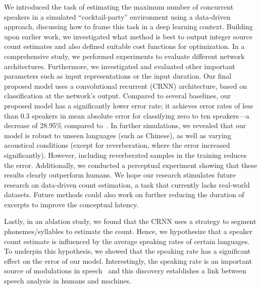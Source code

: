 We introduced the task of estimating the maximum number of concurrent speakers in a simulated ``cocktail-party'' environment using a data-driven approach, discussing how to frame this task in a deep learning context.
Building upon earlier work, we investigated what method is best to output integer source count estimates and also defined suitable cost functions for optimization.
In a comprehensive study, we performed experiments to evaluate different network architectures.
Furthermore, we investigated and evaluated other important parameters such as input representations or the input duration.
Our final proposed model uses a convolutional recurrent (CRNN) architecture, based on classification at the network's output.
Compared to several baselines, our proposed model has a significantly lower error rate;
it achieves error rates of less than 0.3 speakers in mean absolute error for classifying zero to ten speakers---a decrease of 28.95\% compared to~\cite{stoeter17}.
In further simulations, we revealed that our model is robust to unseen languages (such as Chinese), as well as varying acoustical conditions (except for reverberation, where the error increased significantly).
However, including reverberated samples in the training reduces the error.
Additionally, we conducted a perceptual experiment showing that these results clearly outperform humans.
We hope our research stimulates future research on data-driven count estimation, a task that currently lacks real-world datasets.
Future methods could also work on further reducing the duration of excerpts to improve the conceptual latency.\par
Lastly, in an ablation study, we found that the CRNN uses a strategy to segment phonemes/syllables to estimate the count.
Hence, we hypothesize that a speaker count estimate is influenced by the average speaking rates of certain languages.
To underpin this hypothesis, we showed that the speaking rate has a significant effect on the error of our model.
Interestingly, the speaking rate is an important source of modulations in speech~\cite{plomp83} and this discovery establishes a link between speech analysis in humans and machines.
